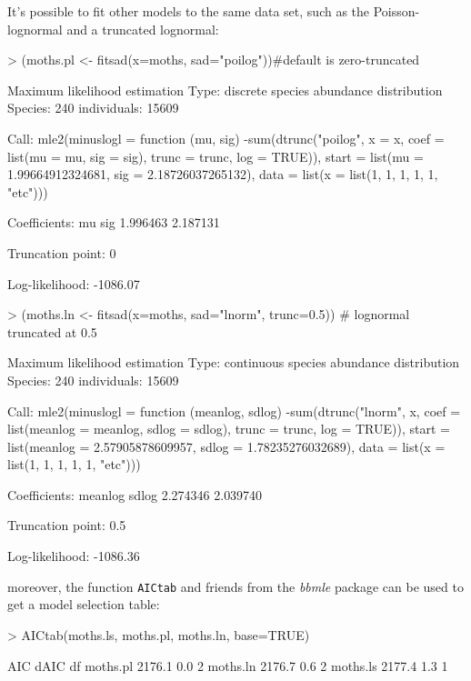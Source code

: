 \documentclass[11pt, A4]{article}
\newcommand{\code}[1]{\texttt{#1}}
\begin{document}
It's possible to fit other models to the same data set, such as the Poisson-lognormal and a truncated lognormal:
\begin{Schunk}
\begin{Sinput}
> (moths.pl <- fitsad(x=moths, sad="poilog"))#default is zero-truncated
\end{Sinput}
\begin{Soutput}
Maximum likelihood estimation
Type: discrete  species abundance distribution
Species: 240 individuals: 15609 

Call:
mle2(minuslogl = function (mu, sig) 
-sum(dtrunc("poilog", x = x, coef = list(mu = mu, sig = sig), 
    trunc = trunc, log = TRUE)), start = list(mu = 1.99664912324681, 
    sig = 2.18726037265132), data = list(x = list(1, 1, 1, 1, 
    1, "etc")))

Coefficients:
      mu      sig 
1.996463 2.187131 

Truncation point: 0 

Log-likelihood: -1086.07 
\end{Soutput}
\begin{Sinput}
> (moths.ln <- fitsad(x=moths, sad="lnorm", trunc=0.5)) # lognormal truncated at 0.5
\end{Sinput}
\begin{Soutput}
Maximum likelihood estimation
Type: continuous  species abundance distribution
Species: 240 individuals: 15609 

Call:
mle2(minuslogl = function (meanlog, sdlog) 
-sum(dtrunc("lnorm", x, coef = list(meanlog = meanlog, sdlog = sdlog), 
    trunc = trunc, log = TRUE)), start = list(meanlog = 2.57905878609957, 
    sdlog = 1.78235276032689), data = list(x = list(1, 1, 1, 
    1, 1, "etc")))

Coefficients:
 meanlog    sdlog 
2.274346 2.039740 

Truncation point: 0.5 

Log-likelihood: -1086.36 
\end{Soutput}
\end{Schunk}

moreover, the function \code{AICtab} and friends from the \emph{bbmle} package can be used to get a model selection table:

\begin{Schunk}
\begin{Sinput}
> AICtab(moths.ls, moths.pl, moths.ln, base=TRUE)
\end{Sinput}
\begin{Soutput}
         AIC    dAIC   df
moths.pl 2176.1    0.0 2 
moths.ln 2176.7    0.6 2 
moths.ls 2177.4    1.3 1 
\end{Soutput}
\end{Schunk}
\end{document}
